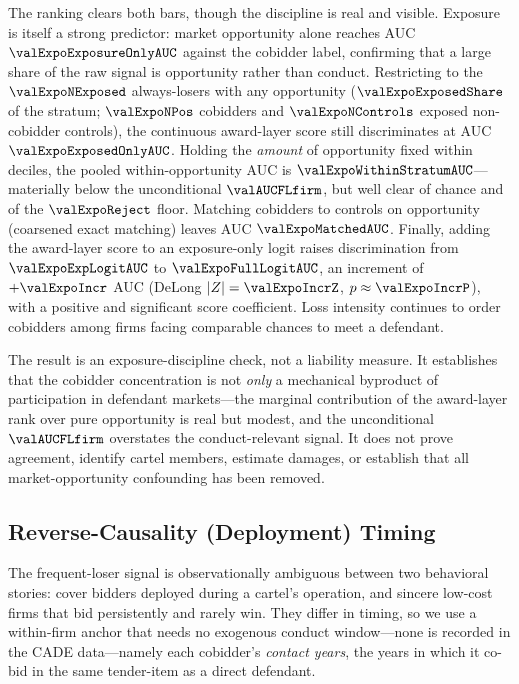 The ranking clears both bars, though the discipline is real and
visible. Exposure is itself a strong predictor: market
opportunity alone reaches AUC $\valExpoExposureOnlyAUC$ against
the cobidder label, confirming that a large share of the raw
signal is opportunity rather than conduct. Restricting to the
$\valExpoNExposed$ always-losers with any opportunity
($\valExpoExposedShare$ of the stratum; $\valExpoNPos$ cobidders
and $\valExpoNControls$ exposed non-cobidder controls), the
continuous award-layer score still discriminates at AUC
$\valExpoExposedOnlyAUC$. Holding the \emph{amount} of
opportunity fixed within deciles, the pooled within-opportunity
AUC is $\valExpoWithinStratumAUC$---materially below the
unconditional $\valAUCFLfirm$, but well clear of chance and of
the $\valExpoReject$ floor. Matching cobidders to controls on
opportunity (coarsened exact matching) leaves AUC
$\valExpoMatchedAUC$. Finally, adding the award-layer score to an
exposure-only logit raises discrimination from
$\valExpoExpLogitAUC$ to $\valExpoFullLogitAUC$, an increment of
$+\valExpoIncr$ AUC (DeLong $|Z|=\valExpoIncrZ$,
$p\approx\valExpoIncrP$), with a positive and significant score
coefficient. Loss intensity continues to order cobidders among
firms facing comparable chances to meet a defendant.

The result is an exposure-discipline check, not a liability
measure. It establishes that the cobidder concentration is not
\emph{only} a mechanical byproduct of participation in defendant
markets---the marginal contribution of the award-layer rank over
pure opportunity is real but modest, and the unconditional
$\valAUCFLfirm$ overstates the conduct-relevant signal. It does
not prove agreement, identify cartel members, estimate damages,
or establish that all market-opportunity confounding has been
removed.

\subsection{Reverse-Causality (Deployment) Timing}
\label{app:deployment_timing_submission}

The frequent-loser signal is observationally ambiguous between
two behavioral stories: cover bidders deployed during a cartel's
operation, and sincere low-cost firms that bid persistently and
rarely win. They differ in timing, so we use a within-firm anchor
that needs no exogenous conduct window---none is recorded in the
CADE data---namely each cobidder's \emph{contact years}, the years
in which it co-bid in the same tender-item as a direct defendant.

